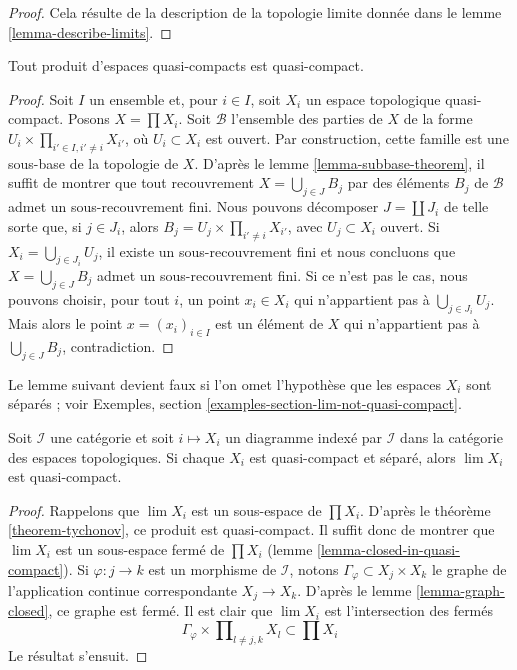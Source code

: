 \begin{proof}
Cela résulte de la description de la topologie limite donnée dans le
lemme \ref{lemma-describe-limits}.
\end{proof}

\begin{theorem}[Tychonov]
\label{theorem-tychonov}
Tout produit d'espaces quasi-compacts est quasi-compact.
\end{theorem}

\begin{proof}
Soit $I$ un ensemble et, pour $i \in I$, soit $X_i$ un espace topologique
quasi-compact. Posons $X = \prod X_i$. Soit $\mathcal{B}$ l'ensemble des
parties de $X$ de la forme
$U_i \times \prod_{i' \in I, i' \not = i} X_{i'}$, où
$U_i \subset X_i$ est ouvert. Par construction, cette famille est une
sous-base de la topologie de $X$. D'après le
lemme \ref{lemma-subbase-theorem}, il suffit de montrer que tout recouvrement
$X = \bigcup_{j \in J} B_j$ par des éléments $B_j$ de $\mathcal{B}$ admet un
sous-recouvrement fini. Nous pouvons décomposer $J = \coprod J_i$ de telle
sorte que, si $j \in J_i$, alors
$B_j = U_j \times \prod_{i' \not = i} X_{i'}$, avec $U_j \subset X_i$
ouvert. Si $X_i = \bigcup_{j \in J_i} U_j$, il existe un sous-recouvrement
fini et nous concluons que $X = \bigcup_{j \in J} B_j$ admet un
sous-recouvrement fini. Si ce n'est pas le cas, nous pouvons choisir, pour
tout $i$, un point $x_i \in X_i$ qui n'appartient pas à
$\bigcup_{j \in J_i} U_j$. Mais alors le point $x = (x_i)_{i \in I}$ est un
élément de $X$ qui n'appartient pas à $\bigcup_{j \in J} B_j$, contradiction.
\end{proof}

\noindent
Le lemme suivant devient faux si l'on omet l'hypothèse que les espaces $X_i$
sont séparés ; voir Exemples,
section \ref{examples-section-lim-not-quasi-compact}.

\begin{lemma}
\label{lemma-inverse-limit-quasi-compact}
Soit $\mathcal{I}$ une catégorie et soit $i \mapsto X_i$ un diagramme indexé
par $\mathcal{I}$ dans la catégorie des espaces topologiques. Si chaque $X_i$
est quasi-compact et séparé, alors $\lim X_i$ est quasi-compact.
\end{lemma}

\begin{proof}
Rappelons que $\lim X_i$ est un sous-espace de $\prod X_i$. D'après le
théorème \ref{theorem-tychonov}, ce produit est quasi-compact. Il suffit donc
de montrer que $\lim X_i$ est un sous-espace fermé de $\prod X_i$
(lemme \ref{lemma-closed-in-quasi-compact}).
Si $\varphi : j \to k$ est un morphisme de $\mathcal{I}$, notons
$\Gamma_\varphi \subset X_j \times X_k$ le graphe de l'application continue
correspondante $X_j \to X_k$. D'après le lemme \ref{lemma-graph-closed}, ce
graphe est fermé. Il est clair que $\lim X_i$ est l'intersection des fermés
$$
\Gamma_\varphi \times \prod\nolimits_{l \not = j, k} X_l
\subset \prod X_i
$$
Le résultat s'ensuit.
\end{proof}

